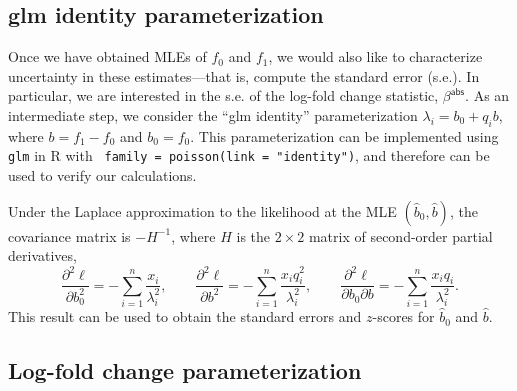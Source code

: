 \documentclass[final]{siamart171218}
\begin{document}
\subsection{glm identity parameterization}

Once we have obtained MLEs of $f_0$ and $f_1$, we would also like to
characterize uncertainty in these estimates---that is, compute the
standard error (s.e.). In particular, we are interested in the s.e. of
the log-fold change statistic, $\beta^{\mathsf{abs}}$. As an
intermediate step, we consider the ``glm identity'' parameterization
$\lambda_i = b_0 + q_i b$, where $b = f_1 - f_0$ and $b_0 = f_0$. This
parameterization can be implemented using {\tt glm} in R with {\tt
  family = poisson(link = "identity")}, and therefore can be used to
verify our calculations.

Under the Laplace approximation to the likelihood at the MLE
$(\hat{b}_0, \hat{b})$, the covariance matrix is $-H^{-1}$, where $H$
is the $2 \times 2$ matrix of second-order partial derivatives,
\begin{equation*}
\frac{\partial^2\ell}{\partial b_0^2} = 
-\sum_{i=1}^n \frac{x_i}{\lambda_i^2}, \qquad
\frac{\partial^2\ell}{\partial b^2} = 
-\sum_{i=1}^n \frac{x_i q_i^2}{\lambda_i^2}, \qquad
\frac{\partial^2\ell}{\partial b_0 \partial b} = 
-\sum_{i=1}^n \frac{x_i q_i}{\lambda_i^2}.
\end{equation*}
This result can be used to obtain the standard errors and $z$-scores
for $\hat{b}_0$ and $\hat{b}$.

\subsection{Log-fold change parameterization}
\end{document}
